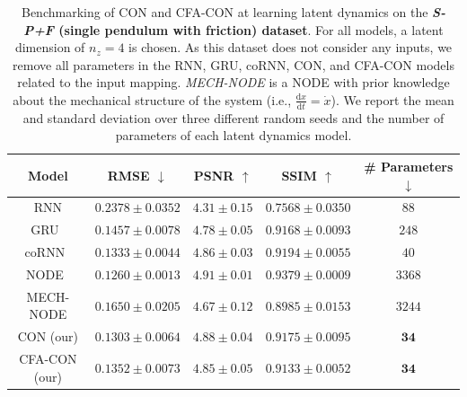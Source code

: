 \begin{table}[ht]
    \centering
    \begin{small}
    \begin{tabular}{c c c c c}
         \toprule
         \textbf{Model} & \textbf{RMSE} $\downarrow$ & \textbf{PSNR} $\uparrow$ & \textbf{SSIM} $\uparrow$ & \textbf{\# Parameters} $\downarrow$ \\
         \midrule
         RNN & $0.2378 \pm 0.0352$ & $4.31 \pm 0.15$ & $0.7568 \pm 0.0350$ & $88$\\
         GRU~\cite{cho2014learning} & $0.1457 \pm 0.0078$ & $4.78 \pm 0.05$ & $0.9168 \pm 0.0093$ & $248$\\
         coRNN~\cite{rusch2020coupled} & $0.1333 \pm 0.0044$ & $4.86 \pm 0.03$ & $0.9194 \pm 0.0055$ & $40$\\
         NODE~\cite{chen2018neural} & $\mathbf{0.1260 \pm 0.0013}$ & $\mathbf{4.91 \pm 0.01}$ & $\mathbf{0.9379 \pm 0.0009}$ & $3368$\\
         MECH-NODE & $0.1650 \pm 0.0205$ & $4.67 \pm 0.12$ & $0.8985 \pm 0.0153$ & $3244$\\
         CON (our) & $0.1303 \pm 0.0064$ & $4.88 \pm 0.04$ & $0.9175 \pm 0.0095$ & $\mathbf{34}$\\
         CFA-CON (our) & $0.1352 \pm 0.0073$ & $4.85 \pm 0.05$ & $0.9133 \pm 0.0052$ & $\mathbf{34}$\\
         \bottomrule
    \end{tabular}
    \end{small}
    \vspace{0.5cm}
    \caption{Benchmarking of \gls{CON} and \gls{CFA-CON} at learning latent dynamics on the \textbf{\emph{S-P+F} (single pendulum with friction) dataset}. For all models, a latent dimension of $n_z=4$ is chosen. 
    As this dataset does not consider any inputs, we remove all parameters in the RNN, GRU, coRNN, CON, and CFA-CON models related to the input mapping.
    \emph{MECH-NODE} is a \gls{NODE} with prior knowledge about the mechanical structure of the system (i.e., $\frac{\mathrm{d}x}{\mathrm{d}t} = \dot{x}$). We report the mean and standard deviation over three different random seeds and the number of parameters of each latent dynamics model.
    }
    \label{tab:apx-con:latent_dynamics_results:s_p_f}
\end{table}

